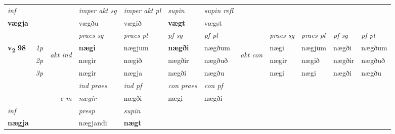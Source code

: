 \begin{longtable}[l]{X>{\footnotesize\itshape}llXXXXlXXXX}
   {\textit{inf}} & &  & \textit{imper akt sg} & \textit{imper akt pl}    & \textit{supin} & \textit{supin refl}  \\*
  {\textbf{vægja}} & && vægðu  & vægið    &  \textbf{vægt} & vægst  \\*

\midrule

 & &   & \textit{praes sg}  & \textit{praes pl}    & \textit{ pf sg} & \textit{pf pl} & & \textit{praes sg}  & \textit{praes pl}    & \textit{pf sg} & \textit{pf pl }  \\ \cmidrule{4-7} \cmidrule{9-12}
 \multirow{2}{*}{{{\textbf{v{\textsubscript{2}}} \Large{\textbf{98}}}}}  & 1p & \multirow{3}{*}{\begin{turn}{90}\textit{akt ind}\end{turn}} & \textbf{nægi} & nægjum & \textbf{nægði} & nægðum & \multirow{3}{*}{\begin{turn}{90}\textit{akt con}\end{turn}} &nægi & nægjum & nægði & nægðum\\*
 & 2p &  &  nægir  & nægið & nægðir & nægðuð & & nægir & nægið & nægðir & nægðuð \\*
 & 3p &  & nægir & nægja & nægði & nægðu & & nægi & nægi& nægði & nægðu \\*
\cmidrule{4-7} \cmidrule{9-12}

   && &  \textit{ind praes} & \textit{ind pf} & \textit{con praes} & \textit{con pf} \\*
\multicolumn{3}{r}{\textit{e-m}} & nægir & nægði & nægi & nægði \\*

\cmidrule{4-7}
   {\textit{inf}} & &     & \textit{presp} & \textit{supin}   \\*
  {\textbf{nægja}} & &     & nægjandi &  \textbf{nægt}   \\*
\midrule


\end{longtable}
